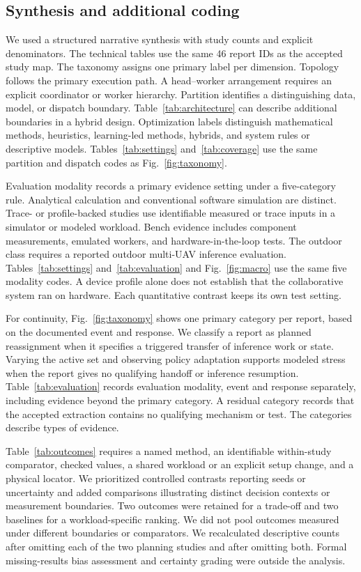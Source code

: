 \documentclass[journal]{IEEEtran}
\begin{document}
\subsection{Synthesis and additional coding}
We used a structured narrative synthesis with study counts and explicit denominators. The technical tables use the same 46 report IDs as the accepted study map. The taxonomy assigns one primary label per dimension. Topology follows the primary execution path. A head--worker arrangement requires an explicit coordinator or worker hierarchy. Partition identifies a distinguishing data, model, or dispatch boundary. Table~\ref{tab:architecture} can describe additional boundaries in a hybrid design. Optimization labels distinguish mathematical methods, heuristics, learning-led methods, hybrids, and system rules or descriptive models. Tables~\ref{tab:settings} and~\ref{tab:coverage} use the same partition and dispatch codes as Fig.~\ref{fig:taxonomy}.

Evaluation modality records a primary evidence setting under a five-category rule. Analytical calculation and conventional software simulation are distinct. Trace- or profile-backed studies use identifiable measured or trace inputs in a simulator or modeled workload. Bench evidence includes component measurements, emulated workers, and hardware-in-the-loop tests. The outdoor class requires a reported outdoor multi-UAV inference evaluation. Tables~\ref{tab:settings} and~\ref{tab:evaluation} and Fig.~\ref{fig:macro} use the same five modality codes. A device profile alone does not establish that the collaborative system ran on hardware. Each quantitative contrast keeps its own test setting.

For continuity, Fig.~\ref{fig:taxonomy} shows one primary category per report, based on the documented event and response. We classify a report as planned reassignment when it specifies a triggered transfer of inference work or state. Varying the active set and observing policy adaptation supports modeled stress when the report gives no qualifying handoff or inference resumption. Table~\ref{tab:evaluation} records evaluation modality, event and response separately, including evidence beyond the primary category. A residual category records that the accepted extraction contains no qualifying mechanism or test. The categories describe types of evidence.

Table~\ref{tab:outcomes} requires a named method, an identifiable within-study comparator, checked values, a shared workload or an explicit setup change, and a physical locator. We prioritized controlled contrasts reporting seeds or uncertainty and added comparisons illustrating distinct decision contexts or measurement boundaries. Two outcomes were retained for a trade-off and two baselines for a workload-specific ranking. We did not pool outcomes measured under different boundaries or comparators. We recalculated descriptive counts after omitting each of the two planning studies and after omitting both. Formal missing-results bias assessment and certainty grading were outside the analysis.
\end{document}
